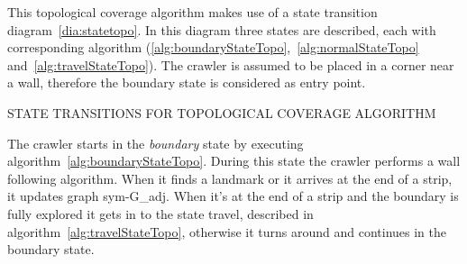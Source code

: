 This topological coverage algorithm makes use of a state transition diagram~\ref{dia:statetopo}. In this diagram three
states are described, each with corresponding algorithm (\ref{alg:boundaryStateTopo},~\ref{alg:normalStateTopo}
and~\ref{alg:travelStateTopo}). The crawler is assumed to be placed in a corner near a wall, therefore the boundary 
state
is considered as entry point.

\begin{RoyalFigure}[!htb, label=dia:statetopo]{STATE TRANSITIONS FOR TOPOLOGICAL COVERAGE ALGORITHM}
\end{RoyalFigure}

The crawler starts in the \emph{boundary} state by executing algorithm~\ref{alg:boundaryStateTopo}. During this state
the crawler performs a wall following algorithm. When it finds a landmark or it arrives at the end of a strip, it 
updates
graph \gls{sym-G_adj}. When it's at the end of a strip and the boundary is fully explored it gets in to the state
travel, described in algorithm~\ref{alg:travelStateTopo}, otherwise it turns around and continues in the boundary state.

